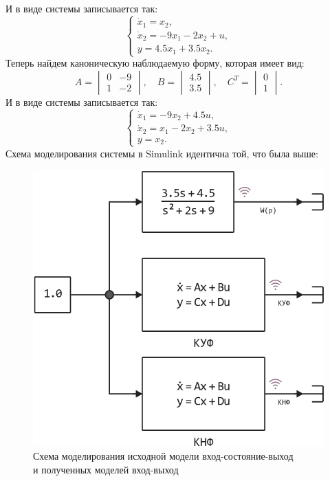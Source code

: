 \documentclass[a4paper]{article}
\begin{document}
И в виде системы записывается так:
$$\begin{cases}
    \dot{x}_1 = x_2, \\ \dot{x}_2 = -9x_1-2x_2+u, \\ y = 4.5x_1+3.5x_2.
\end{cases}$$
Теперь найдем каноническую наблюдаемую форму, которая имеет вид:
$$A = \begin{vmatrix}
    0 & -9 \\ 1 & -2
\end{vmatrix}, \quad B = \begin{vmatrix}
    4.5 \\ 3.5
\end{vmatrix}, \quad C^T = \begin{vmatrix}
    0 \\ 1
\end{vmatrix}.$$
И в виде системы записывается так:
$$\begin{cases}
    \dot{x}_1 = -9x_2+4.5u, \\ \dot{x}_2 = x_1-2x_2+3.5u, \\ y = x_2.
\end{cases}$$
Схема моделирования системы в Simulink идентична той, что была выше:
\begin{figure}[H]
    \centering
    \includegraphics[height=0.23\textheight]{sources/task2_model.png}
    \caption*{Схема моделирования исходной модели вход-состояние-выход\\и полученных моделей вход-выход}
\end{figure}
\end{document}
